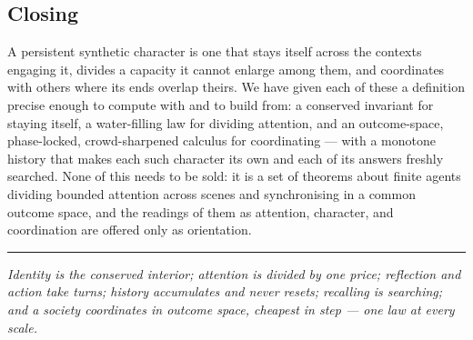 \documentclass[11pt,twocolumn,a4paper]{article}
\begin{document}
\subsection{Closing}

A persistent synthetic character is one that stays itself across the
contexts engaging it, divides a capacity it cannot enlarge among them, and
coordinates with others where its ends overlap theirs. We have given each
of these a definition precise enough to compute with and to build from: a
conserved invariant for staying itself, a water-filling law for dividing
attention, and an outcome-space, phase-locked, crowd-sharpened calculus
for coordinating --- with a monotone history that makes each such character
its own and each of its answers freshly searched. None of this needs to be
sold: it is a set of theorems about finite agents dividing bounded
attention across scenes and synchronising in a common outcome space, and
the readings of them as attention, character, and coordination are offered
only as orientation.

\vspace{0.6em}
\hrule
\vspace{0.4em}
\noindent\emph{Identity is the conserved interior; attention is divided by
one price; reflection and action take turns; history accumulates and never
resets; recalling is searching; and a society coordinates in outcome space,
cheapest in step --- one law at every scale.}



\end{document}
